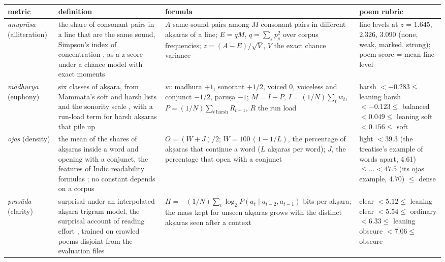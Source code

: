 \documentclass[11pt]{article}
\begin{document}
\begin{table}[t]
\centering\scriptsize
\renewcommand{\arraystretch}{1.05}
\begin{tabularx}{\textwidth}{@{}>{\raggedright\arraybackslash}p{1.45cm}Y>{\raggedright\arraybackslash}p{4.95cm}>{\raggedright\arraybackslash}p{3.45cm}@{}}
\toprule
metric & definition & formula & poem rubric \\
\midrule
\textit{anuprāsa} (alliteration) & the share of consonant pairs in a line that are the same sound, Simpson's index of concentration \citep{simpson1949diversity}, as a z-score under a chance model with exact moments & $A$ same-sound pairs among $M$ consonant pairs in different akṣaras of a line; $E = qM$, $q = \sum_s p_s^2$ over corpus frequencies; $z = (A - E)/\sqrt{V}$, $V$ the exact chance variance & line levels at $z$ = 1.645, 2.326, 3.090 (none, weak, marked, strong); poem score = mean line level \\
\textit{mādhurya} (euphony) & six classes of akṣara, from Mammaṭa's soft and harsh lists \citep{mammata_kavyaprakasa} and the sonority scale \citep{parker2011sonority}, with a run-load term for harsh akṣaras that pile up & $w$: madhura $+1$, sonorant $+1/2$, voiced 0, voiceless and conjunct $-1/2$, paruṣa $-1$; $M = I - P$, $I = (1/N) \sum_t w_t$, $P = (1/N) \sum_{t\ \mathrm{harsh}} R_{t-1}$, $R$ the run load & harsh $< -0.283 \leq$ leaning harsh $< -0.123 \leq$ balanced $< 0.049 \leq$ leaning soft $< 0.156 \leq$ soft \\
\textit{ojas} (density) & the mean of the shares of akṣaras inside a word and opening with a conjunct, the features of Indic readability formulas \citep{sinha2012readability}; no constant depends on a corpus & $O = (W + J)/2$; $W = 100\,(1 - 1/L)$, the percentage of akṣaras that continue a word ($L$ akṣaras per word); $J$, the percentage that open with a conjunct & light $< 39.3$ (the treatise's example of words apart, 4.61) $\leq \dots < 47.5$ (its ojas example, 4.70) $\leq$ dense \\
\textit{prasāda} (clarity) & surprisal under an interpolated akṣara trigram model, the surprisal account of reading effort \citep{hale2001earley,smith2013predictability}, trained on crawled poems disjoint from the evaluation files & $H = -(1/N) \sum_t \log_2 P(a_t \mid a_{t-2}, a_{t-1})$ bits per akṣara; the mass kept for unseen akṣaras grows with the distinct akṣaras seen after a context \citep{witten1991zero} & clear $< 5.12 \leq$ leaning clear $< 5.54 \leq$ ordinary $< 6.33 \leq$ leaning obscure $< 7.06 \leq$ obscure \\

\end{tabularx}
\end{table}
\end{document}
